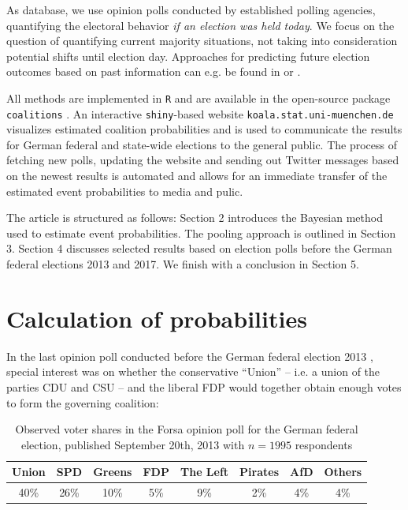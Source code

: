 \documentclass[smallcondensed]{svjour3}     %
\begin{document}
As database, we use opinion polls conducted by established polling agencies,
quantifying the electoral behavior \textit{if an election was held today}.
We focus on the question of quantifying current majority situations, not
taking into consideration potential shifts until election day.
Approaches for predicting future election outcomes based on past
information can e.g. be found in \citet{graefe_2017} or \citet{norpoth_gschwend_2010}.

All methods are implemented in \texttt{R} \citep{r_2017} and are available in the open-source
package \texttt{coalitions} \citep{bender_bauer_2018}. An
interactive \texttt{shiny}-based \citep{chang_2017} website \texttt{koala.stat.uni-\allowbreak muenchen.\allowbreak de}
visualizes estimated coalition probabilities and is used to communicate the results
for German federal and state-wide elections to the general public.
The process of fetching new polls, updating the website and sending out Twitter messages based on the newest results is automated and allows for an immediate transfer of the estimated event probabilities to media and pulic.

The article is structured as follows: Section 2 introduces the Bayesian method
used to estimate event probabilities. The pooling approach is outlined in
Section 3. Section 4 discusses selected results based on election polls before
the German federal elections 2013 and 2017.
We finish with a conclusion in Section 5.



\section{Calculation of probabilities} \label{sec:method}
In the last opinion poll conducted before the German federal election 2013 \citep{forsa_2013}, special interest was on whether the conservative ``Union'' -- i.e. a union of the parties CDU and CSU -- and the liberal FDP would together obtain enough votes to form the governing coalition:

\begin{table}[!ht]\centering
\caption{Observed voter shares in the Forsa opinion poll for the German federal election, published September 20th, 2013 with $n=1995$ respondents
\label{tab_fdp}
}
\medskip
\begin{tabular}{cccccccc}
\toprule[0.09 em]
Union & SPD & Greens & FDP & The Left & Pirates & AfD & Others \\
\midrule
40\% & 26\% & 10\% & 5\% & 9\% & 2\% & 4\% & 4\% \\
\bottomrule[0.09 em]
\end{tabular}
\end{table}
\end{document}
